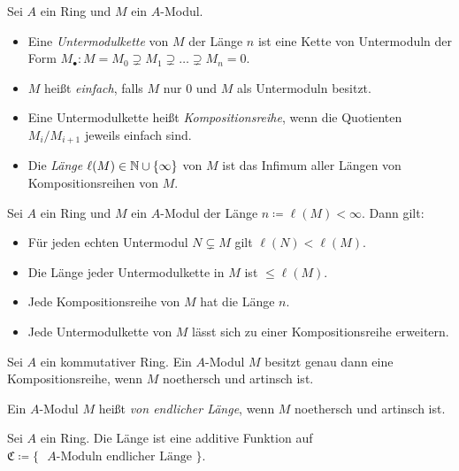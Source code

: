 \documentclass{cheat-sheet}
\newcommand{\SC}{\mathfrak{C}} %
\newcommand{\len}{\ell} %
\begin{document}


\begin{defn}
  Sei $A$ ein Ring und $M$ ein $A$-Modul.
  \begin{itemize}
    \item Eine \emph{Untermodulkette} von $M$ der Länge $n$ ist eine Kette von Untermoduln der Form $M_\bullet : M = M_0 \supsetneq M_1 \supsetneq \ldots \supsetneq M_n = 0$.
    \item $M$ heißt \emph{einfach}, falls $M$ nur $0$ und $M$ als Untermoduln besitzt.
    \item Eine Untermodulkette heißt \emph{Kompositionsreihe}, wenn die Quotienten $M_i/M_{i+1}$ jeweils einfach sind.
    \item Die \emph{Länge} $\len(M) \in \N \cup \{ \infty \}$ von $M$ ist das Infimum aller Längen von Kompositionsreihen von $M$.
  \end{itemize}
\end{defn}

\begin{prop}
  Sei $A$ ein Ring und $M$ ein $A$-Modul der Länge $n \coloneqq \len(M) < \infty$.
  Dann gilt:
  \begin{itemize}
    \item Für jeden echten Untermodul $N \subsetneq M$ gilt $\len(N) < \len(M)$.
    \item Die Länge jeder Untermodulkette in $M$ ist $\leq \len(M)$.
    \item Jede Kompositionsreihe von $M$ hat die Länge $n$.
    \item Jede Untermodulkette von $M$ lässt sich zu einer Kompositionsreihe erweitern.
  \end{itemize}
\end{prop}


\begin{prop}
  Sei $A$ ein kommutativer Ring.
  Ein $A$-Modul $M$ besitzt genau dann eine Kompositionsreihe, wenn $M$ noethersch und artinsch ist.
\end{prop}

\begin{defn}
  Ein $A$-Modul $M$ heißt \emph{von endlicher Länge}, wenn $M$ noethersch und artinsch ist.
\end{defn}

\begin{prop}
  Sei $A$ ein Ring.
  Die Länge ist eine additive Funktion auf $\SC \coloneqq \{ \text{ $A$-Moduln endlicher Länge } \}$.
\end{prop}
\end{document}
